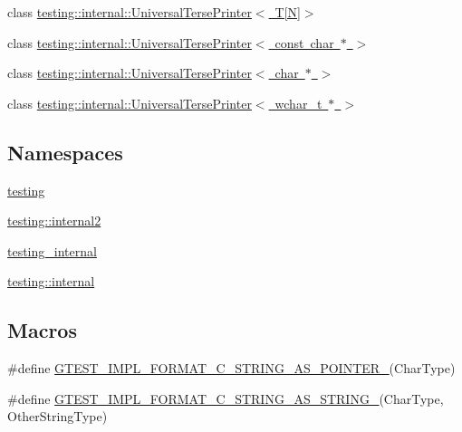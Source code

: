 \begin{DoxyCompactItemize}
\item 
class \mbox{\hyperlink{classtesting_1_1internal_1_1_universal_terse_printer_3_01_t[_n]_4}{testing\+::internal\+::\+Universal\+Terse\+Printer$<$ T\mbox{[}\+N\mbox{]}$>$}}
\item 
class \mbox{\hyperlink{classtesting_1_1internal_1_1_universal_terse_printer_3_01const_01char_01_5_01_4}{testing\+::internal\+::\+Universal\+Terse\+Printer$<$ const char $\ast$ $>$}}
\item 
class \mbox{\hyperlink{classtesting_1_1internal_1_1_universal_terse_printer_3_01char_01_5_01_4}{testing\+::internal\+::\+Universal\+Terse\+Printer$<$ char $\ast$ $>$}}
\item 
class \mbox{\hyperlink{classtesting_1_1internal_1_1_universal_terse_printer_3_01wchar__t_01_5_01_4}{testing\+::internal\+::\+Universal\+Terse\+Printer$<$ wchar\+\_\+t $\ast$ $>$}}
\end{DoxyCompactItemize}
\subsection*{Namespaces}
\begin{DoxyCompactItemize}
\item 
 \mbox{\hyperlink{namespacetesting}{testing}}
\item 
 \mbox{\hyperlink{namespacetesting_1_1internal2}{testing\+::internal2}}
\item 
 \mbox{\hyperlink{namespacetesting__internal}{testing\+\_\+internal}}
\item 
 \mbox{\hyperlink{namespacetesting_1_1internal}{testing\+::internal}}
\end{DoxyCompactItemize}
\subsection*{Macros}
\begin{DoxyCompactItemize}
\item 
\#define \mbox{\hyperlink{googletest-master_2googletest_2include_2gtest_2gtest-printers_8h_a79d4724b4bc2a1dd8493c366b5ca626a}{G\+T\+E\+S\+T\+\_\+\+I\+M\+P\+L\+\_\+\+F\+O\+R\+M\+A\+T\+\_\+\+C\+\_\+\+S\+T\+R\+I\+N\+G\+\_\+\+A\+S\+\_\+\+P\+O\+I\+N\+T\+E\+R\+\_\+}}(Char\+Type)
\item 
\#define \mbox{\hyperlink{googletest-master_2googletest_2include_2gtest_2gtest-printers_8h_ad6102ed2a0571d5196e606a061c16a10}{G\+T\+E\+S\+T\+\_\+\+I\+M\+P\+L\+\_\+\+F\+O\+R\+M\+A\+T\+\_\+\+C\+\_\+\+S\+T\+R\+I\+N\+G\+\_\+\+A\+S\+\_\+\+S\+T\+R\+I\+N\+G\+\_\+}}(Char\+Type,  Other\+String\+Type)
\end{DoxyCompactItemize}
